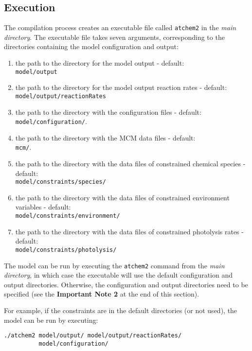 \subsection{Execution} \label{subsec:execution}

The compilation process creates an executable file called
\texttt{atchem2} in the \emph{main directory}. The executable file
takes seven arguments, corresponding to the directories containing the
model configuration and output:

\begin{enumerate}
\item the path to the directory for the model output - default:\\
\texttt{model/output}
\item the path to the directory for the model output reaction rates -
default:\\ \texttt{model/output/reactionRates}
\item the path to the directory with the configuration files -
default:\\ \texttt{model/configuration/}.
\item the path to the directory with the MCM data files - default:\\
\texttt{mcm/}.
\item the path to the directory with the data files of constrained
chemical species - default:\\ \texttt{model/constraints/species/}
\item the path to the directory with the data files of constrained
environment variables - default:\\
\texttt{model/constraints/environment/}
\item the path to the directory with the data files of constrained
photolysis rates - default:\\ \texttt{model/constraints/photolysis/}
\end{enumerate}

The model can be run by executing the \texttt{atchem2} command from
the \emph{main directory}, in which case the executable will use the
default configuration and output directories. Otherwise, the
configuration and output directories need to be specified (see the
\textbf{Important Note 2} at the end of this section).

For example, if the constraints are in the default directories (or not
used), the model can be run by executing:

\begin{verbatim}
./atchem2 model/output/ model/output/reactionRates/
          model/configuration/
\end{verbatim}

